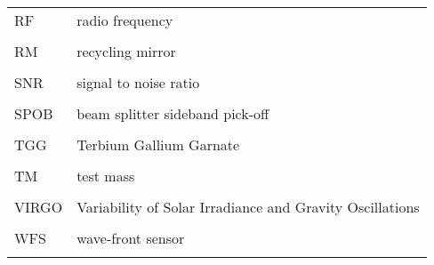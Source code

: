\singlespacing
\begin{tabular}{lp{5in}}
RF & radio frequency \\
\\
 RM & recycling mirror \\
\\
 SNR & signal to noise ratio \\
\\
SPOB & beam splitter sideband pick-off \\
\\
TGG & Terbium Gallium Garnate \\
\\
TM & test mass \\
\\
VIRGO & Variability of Solar Irradiance and Gravity Oscillations \\
\\
WFS & wave-front sensor \\
\\
\end{tabular}
\doublespacing

